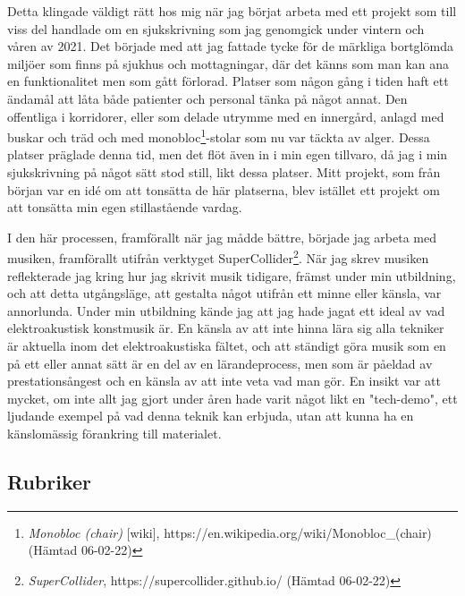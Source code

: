 \documentclass{article}
\begin{document}
Detta klingade väldigt rätt hos mig när jag börjat arbeta med ett projekt som till viss del handlade om en
sjukskrivning som jag genomgick under vintern och våren av 2021. Det började med att jag fattade tycke för de
märkliga bortglömda miljöer som finns på sjukhus och mottagningar, där det känns som man kan ana en
funktionalitet men som gått förlorad. Platser som någon gång i tiden haft ett ändamål att låta både patienter
och personal tänka på något annat. Den offentliga i korridorer, eller som delade utrymme med
en innergård, anlagd med buskar och träd och med monobloc\footnote{\emph{Monobloc
(chair)} [wiki], https://en.wikipedia.org/wiki/Monobloc\_(chair) (Hämtad 06-02-22)}-stolar som nu var täckta av
alger. Dessa platser präglade denna tid, men det flöt även in i min egen tillvaro, då jag i min sjukskrivning
på något sätt stod still, likt dessa platser. Mitt projekt, som från början var en idé om att tonsätta de här
platserna, blev istället ett projekt om att tonsätta min egen stillastående vardag. 

I den här processen, framförallt när jag mådde bättre, började jag arbeta med musiken, framförallt utifrån
verktyget SuperCollider\footnote{\emph{SuperCollider}, https://supercollider.github.io/ (Hämtad 06-02-22)}.
När jag skrev musiken reflekterade jag kring hur jag skrivit musik tidigare, främst under min utbildning, och
att detta utgångsläge, att gestalta något utifrån ett minne eller känsla, var annorlunda. Under min utbildning
kände jag att jag hade jagat ett ideal av vad elektroakustisk konstmusik är. En känsla av att inte hinna lära
sig alla tekniker är aktuella inom det elektroakustiska fältet, och att ständigt göra musik som en på ett
eller annat sätt är en del av en lärandeprocess, men som är påeldad av prestationsångest och en känsla av att
inte veta vad man gör. En insikt var att mycket, om inte allt jag gjort under åren hade varit något likt en
"tech-demo", ett ljudande exempel på vad denna teknik kan erbjuda, utan att kunna ha en känslomässig
förankring till materialet. 





\subsection{Rubriker}
\end{document}
